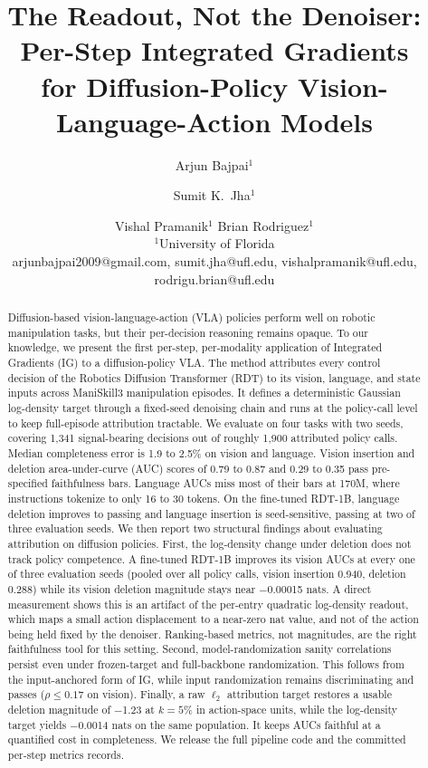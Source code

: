 \documentclass{article}
\title{The Readout, Not the Denoiser: Per-Step Integrated Gradients\\for Diffusion-Policy Vision-Language-Action Models}
\author{
Arjun Bajpai$^1$
\and
Sumit K.\ Jha$^1$
\and
Vishal Pramanik$^1$
\And
Brian Rodriguez$^1$\\
\affiliations
$^1$University of Florida\\
\emails
arjunbajpai2009@gmail.com,
sumit.jha@ufl.edu,
vishalpramanik@ufl.edu,
rodrigu.brian@ufl.edu
}
\begin{document}
\maketitle

\begin{abstract}
Diffusion-based vision-language-action (VLA) policies perform well on robotic manipulation tasks, but their per-decision reasoning remains opaque.
To our knowledge, we present the first per-step, per-modality application of Integrated Gradients (IG) to a diffusion-policy VLA.
The method attributes every control decision of the Robotics Diffusion Transformer (RDT) to its vision, language, and state inputs across ManiSkill3 manipulation episodes.
It defines a deterministic Gaussian log-density target through a fixed-seed denoising chain and runs at the policy-call level to keep full-episode attribution tractable.
We evaluate on four tasks with two seeds, covering 1{,}341 signal-bearing decisions out of roughly 1{,}900 attributed policy calls.
Median completeness error is 1.9 to 2.5\% on vision and language.
Vision insertion and deletion area-under-curve (AUC) scores of 0.79 to 0.87 and 0.29 to 0.35 pass pre-specified faithfulness bars.
Language AUCs miss most of their bars at 170M, where instructions tokenize to only 16 to 30 tokens.
On the fine-tuned RDT-1B, language deletion improves to passing and language insertion is seed-sensitive, passing at two of three evaluation seeds.
We then report two structural findings about evaluating attribution on diffusion policies.
First, the log-density change under deletion does not track policy competence.
A fine-tuned RDT-1B improves its vision AUCs at every one of three evaluation seeds (pooled over all policy calls, vision insertion 0.940, deletion 0.288) while its vision deletion magnitude stays near $-$0.00015 nats.
A direct measurement shows this is an artifact of the per-entry quadratic log-density readout, which maps a small action displacement to a near-zero nat value, and not of the action being held fixed by the denoiser.
Ranking-based metrics, not magnitudes, are the right faithfulness tool for this setting.
Second, model-randomization sanity correlations persist even under frozen-target and full-backbone randomization.
This follows from the input-anchored form of IG, while input randomization remains discriminating and passes ($\rho \leq 0.17$ on vision).
Finally, a raw $\ell_2$ attribution target restores a usable deletion magnitude of $-$1.23 at $k{=}5\%$ in action-space units, while the log-density target yields $-$0.0014 nats on the same population.
It keeps AUCs faithful at a quantified cost in completeness.
We release the full pipeline code and the committed per-step metrics records.
\end{abstract}
\end{document}
